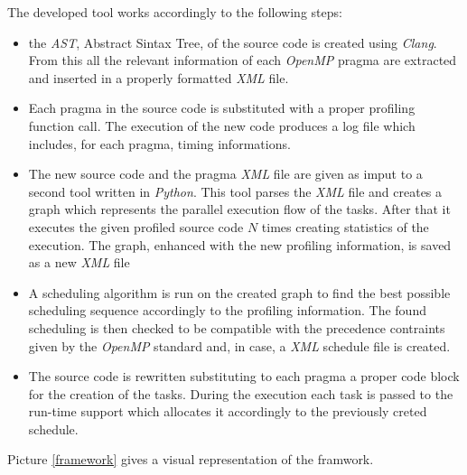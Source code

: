 \documentclass[a4paper,11pt,oneside]{book}
\begin{document}
The developed tool works accordingly to the following steps:
\begin{itemize}
\item{the \emph{AST}, Abstract Sintax Tree, of the source code is created using \emph{Clang}. From this all the relevant information of each \emph{OpenMP} pragma are extracted and inserted in a properly formatted \emph{XML} file.}
\item{Each pragma in the source code is substituted with a proper profiling function call. The execution of the new code produces a log file which includes, for each pragma, timing informations.  }
\item{The new source code and the pragma \emph{XML} file are given as imput to a second tool written in \emph{Python}. This tool parses the \emph{XML} file and creates a graph which represents the parallel execution flow of the tasks. After that it executes the given profiled source code $N$ times creating statistics of the execution. The graph, enhanced with the new profiling information, is saved as a new \emph{XML} file}
\item{ A scheduling algorithm is run on the created graph to find the best possible scheduling sequence accordingly to the profiling information. The found scheduling is then checked to be compatible with the precedence contraints given by the \emph{OpenMP} standard and, in case, a \emph{XML} schedule file is created.}
\item{ The source code is rewritten substituting to each pragma a proper code block for the creation of the tasks. During the execution each task is passed to the run-time support which allocates it accordingly to the previously creted schedule.}
\end{itemize}

Picture \ref{framework} gives a visual representation of the framwork.
\end{document}
